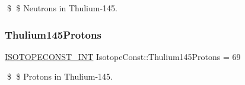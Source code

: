 \$ \$ Neutrons in Thulium-\/145. \mbox{\label{group___isotope_const-_thulium-_tm145_gaaaad96c0278f42d0c8fc892ff82e9c99}} 
\subsubsection{\texorpdfstring{Thulium145\+Protons}{Thulium145Protons}}
{\footnotesize\ttfamily \mbox{\hyperlink{group___isotope_const-_macros_ga5f18360b3e99483a35c32d789e62621c}{I\+S\+O\+T\+O\+P\+E\+C\+O\+N\+S\+T\+\_\+\+I\+NT}} Isotope\+Const\+::\+Thulium145\+Protons = 69}

\$ \$ Protons in Thulium-\/145. 